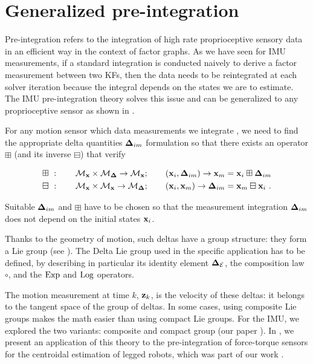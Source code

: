 \section{Generalized pre-integration}
\label{sec:general-preint}


Pre-integration refers to the integration of high rate proprioceptive sensory data in an efficient way in the context of factor graphs. 
As we have seen for IMU measurements, if a standard integration is conducted naively to derive a factor measurement between two KFs, 
then the data needs to be reintegrated at each solver iteration because the integral depends on the states we are to estimate. 
The IMU pre-integration theory solves this issue and can be generalized to any proprioceptive sensor as shown in \cite{atchuthan-18-thesis,deray-19-selfcalib,fourmy2021contact}. 

For any motion sensor which data measurements we integrate , we need to find the appropriate delta quantities ${\bm \Delta}_{im}$ formulation so that there exists an operator $\boxplus$ (and its inverse $\boxminus$) that verify

\begin{align}
    \boxplus~&: \quad\quad \mathcal{M}_{{\bf x}} \times \mathcal{M}_{{\bm \Delta}} \rightarrow \mathcal{M}_{{\bf x}}; 
    \quad\quad ({\bf x}_i,{\bm \Delta}_{im}) \rightarrow {\bf x}_m={\bf x}_i\boxplus {\bm \Delta}_{im} \\
    \boxminus~&: \quad\quad \mathcal{M}_{{\bf x}} \times \mathcal{M}_{{\bf x}} \rightarrow \mathcal{M}_{{\bm \Delta}}; 
    \quad\quad ({\bf x}_i,{\bf x}_m) \rightarrow {\bm \Delta}_{im}={\bf x}_m\boxminus {\bf x}_i~.
\end{align}

Suitable ${\bm \Delta}_{im}$ and $\boxplus$ have to be chosen so that the measurement integration ${\bm \Delta}_{im}$ does not depend on the initial states ${\bf x}_i$.

Thanks to the geometry of motion, such deltas have a group structure: they form a Lie group (see ).
The Delta Lie group used in the specific application has to be defined, by describing in particular its identity element ${\bm \Delta}_{\mathcal{E}}$, the composition law $\circ$, and the $\operatorname*{Exp}$ and $\operatorname*{Log}$ operators.


The motion measurement at time $k$, ${\bf z}_k$, is the velocity of these deltas: it belongs to the tangent space of the group of deltas. 
In some cases, using composite Lie groups makes the math easier than using compact Lie groups. For the IMU, we explored the two variants: composite \cite{forster2015imu} and compact group (our paper \cite{fourmy2019absolute}). In , we present an application of this theory to the pre-integration of force-torque sensors for the centroidal estimation of legged robots, which was part of our work \cite{fourmy2021contact}.

